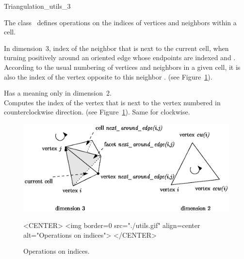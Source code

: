 

\begin{ccRefClass}{Triangulation_utils_3}

\ccDefinition
  
The class \ccRefName\ defines operations on the indices of vertices
and neighbors within a cell.


\ccOperations


{In dimension~3, index of the neighbor  that is next to the current cell,
when turning positively around an oriented edge whose endpoints are
indexed  and . According to the usual numbering of
vertices and neighbors in a given cell, it is also the index of the vertex 
opposite to this neighbor . (see Figure~\ref{Triangulation3-fig-utils}).
}

{Has a meaning only in dimension~2.\\
 Computes the index of the vertex that is next to the vertex numbered
 in counterclockwise direction. (see
Figure~\ref{Triangulation3-fig-utils}).  
}
\ccGlue
{}
{Same for clockwise.}

\begin{figure}[htbp]
\begin{ccTexOnly}
\begin{center} 
\includegraphics{TriangulationDS_3_ref/utils.eps} 
\end{center}
\end{ccTexOnly}
\caption{Operations on indices.
\label{Triangulation3-fig-utils}}
\begin{ccHtmlOnly}
<CENTER>
<img border=0 src="./utils.gif" align=center alt="Operations on indices">
</CENTER>
\end{ccHtmlOnly}
\end{figure} 

\end{ccRefClass}
